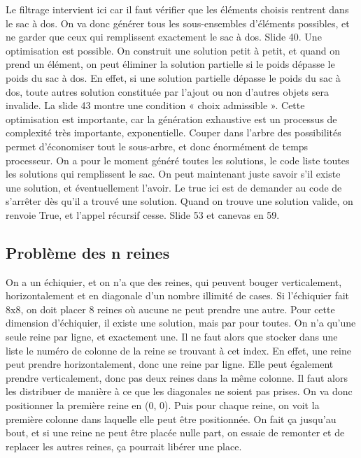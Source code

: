 \documentclass[10pt]{article}
\begin{document}
\newline \newline 
Le filtrage intervient ici car il faut vérifier que les éléments choisis rentrent dans le sac à dos. On va donc générer tous les sous-ensembles d'éléments possibles, et ne garder que ceux qui remplissent exactement le sac à dos. Slide 40. 
\newline \newline 
Une optimisation est possible. On construit une solution petit à petit, et quand on prend un élément, on peut éliminer la solution partielle si le poids dépasse le poids du sac à dos. En effet, si une solution partielle dépasse le poids du sac à dos, toute autres solution constituée par l'ajout ou non d'autres objets sera invalide. La slide 43 montre une condition « choix admissible ». 
\newline \newline 
Cette optimisation est importante, car la génération exhaustive est un processus de complexité très importante, exponentielle. Couper dans l'arbre des possibilités permet d'économiser tout le sous-arbre, et donc énormément de temps processeur. 
\newline \newline 
On a pour le moment généré toutes les solutions, le code liste toutes les solutions qui remplissent le sac. On peut maintenant juste savoir s'il existe une solution, et éventuellement l'avoir. Le truc ici est de demander au code de s'arrêter dès qu'il a trouvé une solution. Quand on trouve une solution valide, on renvoie True, et l'appel récursif cesse. Slide 53 et canevas en 59. 
\subsection{Problème des n reines}
On a un échiquier, et on n'a que des reines, qui peuvent bouger verticalement, horizontalement et en diagonale d'un nombre illimité de cases. Si l'échiquier fait 8x8, on doit placer 8 reines où aucune ne peut prendre une autre. Pour cette dimension d'échiquier, il existe une solution, mais par pour toutes.  
\newline \newline 
On n'a qu'une seule reine par ligne, et exactement une. Il ne faut alors que stocker dans une liste le numéro de colonne de la reine se trouvant à cet index. 
\newline \newline 
En effet, une reine peut prendre horizontalement, donc une reine par ligne. Elle peut également prendre verticalement, donc pas deux reines dans la même colonne. Il faut alors les distribuer de manière à ce que les diagonales ne soient pas prises. 
\newline \newline 
On va donc positionner la première reine en (0, 0). Puis pour chaque reine, on voit la première colonne dans laquelle elle peut être positionnée. On fait ça jusqu'au bout, et si une reine ne peut être placée nulle part, on essaie de remonter et de replacer les autres reines, ça pourrait libérer une place.
\end{document}
